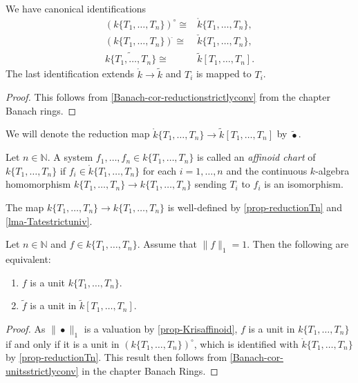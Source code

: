 \begin{proposition}\label{prop-reductionTn}
    We have canonical identifications
    \[
        \begin{aligned}
        (k\{T_1,\ldots,T_n\} )^{\circ}\cong & \mathring{k}\{T_1,\ldots,T_n\},\\
        (k\{T_1,\ldots,T_n\} )^{\check{}}\cong & \check{k}\{T_1,\ldots,T_n\},\\
        \widetilde{k\{T_1,\ldots,T_n\}  }\cong & \tilde{k}[T_1,\ldots,T_n].
        \end{aligned}
    \]
    The last identification extends $\mathring{k}\rightarrow \tilde{k}$ and $T_i$ is mapped to $T_i$.
\end{proposition}
\begin{proof}
    This follows from \cref{Banach-cor-reductionstrictlyconv} from the chapter Banach rings.
\end{proof}
We will denote the reduction map $\mathring{k}\{T_1,\ldots,T_n\}\rightarrow \tilde{k}[T_1,\ldots,T_n]$ by $\tilde{\bullet}$.

\begin{definition}\label{def-affchart}
    Let $n\in \mathbb{N}$. A system $f_1,\ldots,f_n\in k\{T_1,\ldots,T_n\}$ is called an \emph{affinoid chart} of $k\{T_1,\ldots,T_n\}$ if $f_i\in \mathring{k}\{T_1,\ldots,T_n\}$ for each $i=1,\ldots,n$ and the continuous $k$-algebra homomorphism $k\{T_1,\ldots,T_n\}\rightarrow k\{T_1,\ldots,T_n\}$ sending $T_i$ to $f_i$ is an isomorphism.
\end{definition}
The map $k\{T_1,\ldots,T_n\}\rightarrow k\{T_1,\ldots,T_n\}$ is well-defined by \cref{prop-reductionTn} and \cref{lma-Tatestrictuniv}.


\begin{lemma}\label{lma-unitsTate}
    Let $n\in \mathbb{N}$ and $f\in k\{T_1,\ldots,T_n\}$. Assume that $\|f\|_1=1$. Then the following are equivalent:
    \begin{enumerate}
        \item $f$ is a unit $k\{T_1,\ldots,T_n\}$.
        \item $\tilde{f}$ is a unit in $\tilde{k}[T_1,\ldots,T_n]$.
    \end{enumerate}
\end{lemma}
\begin{proof}
    As $\|\bullet\|_1$ is a valuation by \cref{prop-Krisaffinoid}, $f$ is a unit in $k\{T_1,\ldots,T_n\}$ if and only if it is a unit in $(k\{T_1,\ldots,T_n\} )^{\circ}$, which is identified with $\mathring{k}\{T_1,\ldots,T_n\}$ by \cref{prop-reductionTn}. This result then follows from \cref{Banach-cor-unitsstrictlyconv} in the chapter Banach Rings.
\end{proof}

